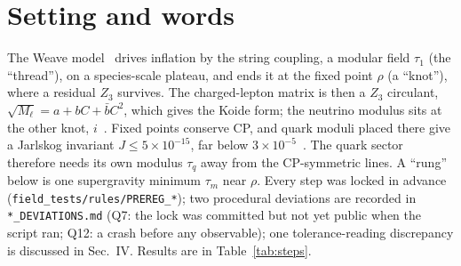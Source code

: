 \documentclass[aps,prd,twocolumn,superscriptaddress,nofootinbib,showkeys]{revtex4-2}
\begin{document}
\section{Setting and words}
The Weave model~\cite{P1} drives inflation by the string coupling, a modular field $\tau_1$ (the ``thread''), on a species-scale plateau, and ends it at the fixed point $\rho$ (a ``knot''), where a residual $Z_3$ survives. The charged-lepton matrix is then a $Z_3$ circulant, $\sqrt{M_\ell}=a+bC+\bar bC^2$, which gives the Koide form; the neutrino modulus sits at the other knot, $i$~\cite{P2}. Fixed points conserve CP, and quark moduli placed there give a Jarlskog invariant $J\le5\times10^{-15}$, far below $3\times10^{-5}$~\cite{P2}. The quark sector therefore needs its own modulus $\tau_q$ away from the CP-symmetric lines. A ``rung'' below is one supergravity minimum $\tau_m$ near $\rho$. Every step was locked in advance (\texttt{field\_tests/rules/PREREG\_*}); two procedural deviations are recorded in \texttt{*\_DEVIATIONS.md} (Q7: the lock was committed but not yet public when the script ran; Q12: a crash before any observable); one tolerance-reading discrepancy is discussed in Sec.~IV. Results are in Table~\ref{tab:steps}.
\end{document}
